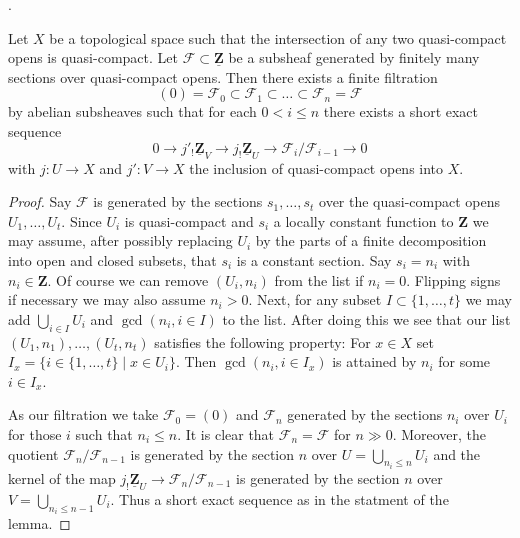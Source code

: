 \begin{lemma}
\label{lemma-subsheaf-of-constant-sheaf}
\begin{reference}
\cite[Page 168]{Tohoku}.
\end{reference}
Let $X$ be a topological space such that the intersection of any
two quasi-compact opens is quasi-compact. Let
$\mathcal{F} \subset \underline{\mathbf{Z}}$
be a subsheaf generated by finitely many sections over quasi-compact opens.
Then there exists a finite filtration
$$
(0) = \mathcal{F}_0 \subset \mathcal{F}_1 \subset \ldots \subset
\mathcal{F}_n = \mathcal{F}
$$
by abelian subsheaves such that for each $0 < i \leq n$
there exists a short exact sequence
$$
0 \to j'_!\underline{\mathbf{Z}}_V \to j_!\underline{\mathbf{Z}}_U \to
\mathcal{F}_i/\mathcal{F}_{i - 1} \to 0
$$
with $j : U \to X$ and $j' : V \to X$ the inclusion of quasi-compact opens
into $X$.
\end{lemma}

\begin{proof}
Say $\mathcal{F}$ is generated by the sections $s_1, \ldots, s_t$ over the
quasi-compact opens $U_1, \ldots, U_t$. Since $U_i$ is quasi-compact and
$s_i$ a locally constant function to $\mathbf{Z}$ we may assume, after
possibly replacing $U_i$ by the parts of a finite decomposition into open
and closed subsets, that $s_i$ is a constant section.
Say $s_i = n_i$ with $n_i \in \mathbf{Z}$. Of course we can remove
$(U_i, n_i)$ from the list if $n_i = 0$. Flipping signs if necessary
we may also assume $n_i > 0$. Next, for any subset $I \subset \{1, \ldots, t\}$
we may add $\bigcup_{i \in I} U_i$ and $\gcd(n_i, i \in I)$ to the list.
After doing this we see that our list $(U_1, n_1), \ldots, (U_t, n_t)$
satisfies the following property:
For $x \in X$ set $I_x = \{i \in \{1, \ldots, t\} \mid x \in U_i\}$.
Then $\gcd(n_i, i \in I_x)$ is attained by $n_i$ for some $i \in I_x$.

\medskip\noindent
As our filtration we take $\mathcal{F}_0 = (0)$ and
$\mathcal{F}_n$ generated by the sections $n_i$ over $U_i$ for those
$i$ such that $n_i \leq n$. It is clear that
$\mathcal{F}_n = \mathcal{F}$ for $n \gg 0$. Moreover, the quotient
$\mathcal{F}_n/\mathcal{F}_{n - 1}$ is generated by the section
$n$ over $U = \bigcup_{n_i \leq n} U_i$ and the kernel of the map
$j_!\underline{\mathbf{Z}}_U \to \mathcal{F}_n/\mathcal{F}_{n - 1}$
is generated by the section $n$ over $V = \bigcup_{n_i \leq n - 1} U_i$.
Thus a short exact sequence as in the statment of the lemma.
\end{proof}


